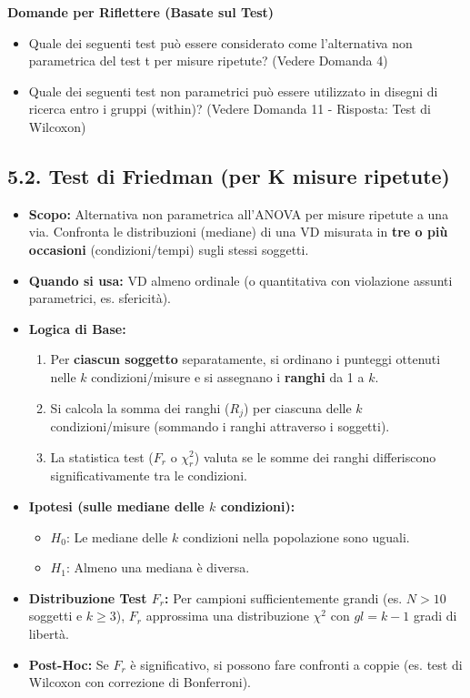 \documentclass[12pt, a4paper]{article}
\newenvironment{reflectionbox}{%
    \medskip
    \begin{framed}\par\noindent
    \textbf{\color{boxtitlecolor}Domande per Riflettere (Basate sul Test)} \par
    \begin{itemize}[leftmargin=*, label=$\blacktriangleright$]
}{%
    \end{itemize}\par
    \end{framed}
    \medskip
}
\newcommand{\chisq}{\chi^2} %
\newcommand{\Hnull}{H_0} %
\newcommand{\Halt}{H_1} %
\newcommand{\df}{gl} %
\newcommand{\FrFried}{F_r} %
\begin{document}
\begin{reflectionbox}
    \item Quale dei seguenti test può essere considerato come l'alternativa non parametrica del test t per misure ripetute? (Vedere Domanda 4)
    \item Quale dei seguenti test non parametrici può essere utilizzato in disegni di ricerca entro i gruppi (within)? (Vedere Domanda 11 - Risposta: Test di Wilcoxon)
\end{reflectionbox}

\subsection*{5.2. Test di Friedman (per K misure ripetute)}
\begin{itemize}
    \item \textbf{Scopo:} Alternativa non parametrica all'ANOVA per misure ripetute a una via. Confronta le distribuzioni (mediane) di una VD misurata in \textbf{tre o più occasioni} (condizioni/tempi) sugli stessi soggetti.
    \item \textbf{Quando si usa:} VD almeno ordinale (o quantitativa con violazione assunti parametrici, es. sfericità).
    \item \textbf{Logica di Base:}
        \begin{enumerate}
            \item Per \textbf{ciascun soggetto} separatamente, si ordinano i punteggi ottenuti nelle $k$ condizioni/misure e si assegnano i \textbf{ranghi} da 1 a $k$.
            \item Si calcola la somma dei ranghi ($R_j$) per ciascuna delle $k$ condizioni/misure (sommando i ranghi attraverso i soggetti).
            \item La statistica test ($\FrFried$ o $\chi^2_r$) valuta se le somme dei ranghi differiscono significativamente tra le condizioni.
        \end{enumerate}
    \item \textbf{Ipotesi (sulle mediane delle $k$ condizioni):}
        \begin{itemize}
            \item $\Hnull$: Le mediane delle $k$ condizioni nella popolazione sono uguali.
            \item $\Halt$: Almeno una mediana è diversa.
        \end{itemize}
    \item \textbf{Distribuzione Test $\FrFried$:} Per campioni sufficientemente grandi (es. $N > 10$ soggetti e $k \ge 3$), $\FrFried$ approssima una distribuzione $\chisq$ con $\df = k-1$ gradi di libertà.
    \item \textbf{Post-Hoc:} Se $\FrFried$ è significativo, si possono fare confronti a coppie (es. test di Wilcoxon con correzione di Bonferroni).
\end{itemize}
\end{document}
